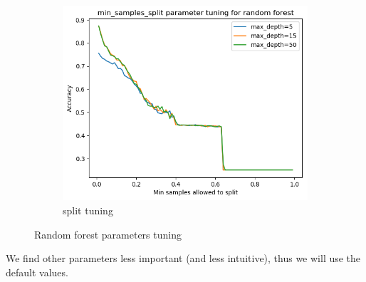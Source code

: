\documentclass[12pt]{article}
\begin{document}
\begin{figure}[h]
\begin{subfigure}{0.3\textwidth}
  \includegraphics[width=1\linewidth]{Cross_valid_plots/s_hyper_forest_fig}
  \caption{split tuning}
  \label{fig:sub2}
\end{subfigure}
\caption{Random forest parameters tuning}
\label{fig:test}
\end{figure}

We find other parameters less important (and less intuitive), thus we will use the default values.

\newpage
\end{document}
